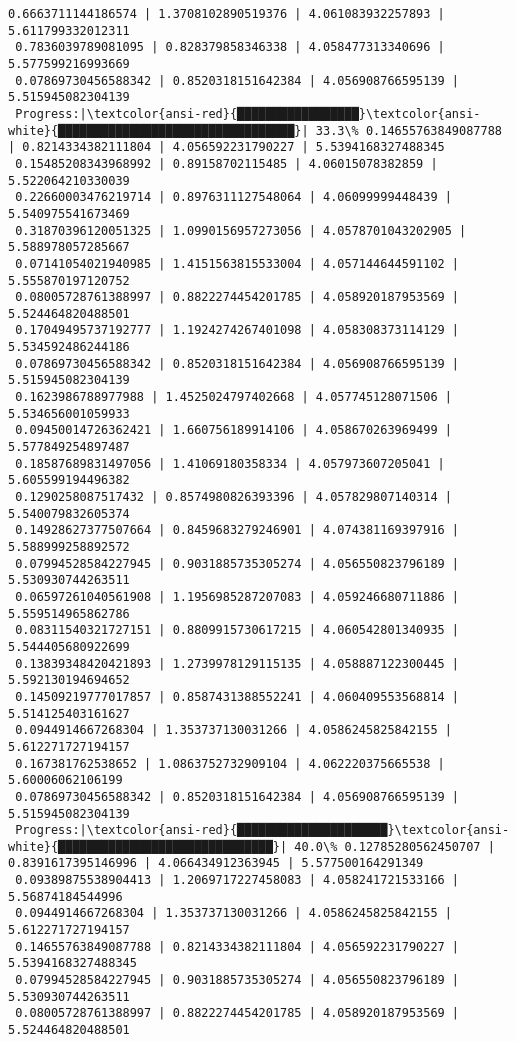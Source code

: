 \documentclass[11pt]{article}
\begin{document}
\begin{Verbatim}[commandchars=\\\{\}]
 0.6663711144186574 | 1.3708102890519376 | 4.061083932257893 | 5.611799332012311
 0.7836039789081095 | 0.828379858346338 | 4.058477313340696 | 5.577599216993669
 0.07869730456588342 | 0.8520318151642384 | 4.056908766595139 | 5.515945082304139
 Progress:|\textcolor{ansi-red}{█████████████████}\textcolor{ansi-white}{█████████████████████████████████}| 33.3\% 0.14655763849087788 | 0.8214334382111804 | 4.056592231790227 | 5.5394168327488345
 0.15485208343968992 | 0.89158702115485 | 4.06015078382859 | 5.522064210330039
 0.22660003476219714 | 0.8976311127548064 | 4.06099999448439 | 5.540975541673469
 0.31870396120051325 | 1.0990156957273056 | 4.0578701043202905 | 5.588978057285667
 0.07141054021940985 | 1.4151563815533004 | 4.057144644591102 | 5.555870197120752
 0.08005728761388997 | 0.8822274454201785 | 4.058920187953569 | 5.524464820488501
 0.17049495737192777 | 1.1924274267401098 | 4.058308373114129 | 5.534592486244186
 0.07869730456588342 | 0.8520318151642384 | 4.056908766595139 | 5.515945082304139
 0.1623986788977988 | 1.4525024797402668 | 4.057745128071506 | 5.534656001059933
 0.09450014726362421 | 1.660756189914106 | 4.058670263969499 | 5.577849254897487
 0.18587689831497056 | 1.41069180358334 | 4.057973607205041 | 5.605599194496382
 0.1290258087517432 | 0.8574980826393396 | 4.057829807140314 | 5.540079832605374
 0.14928627377507664 | 0.8459683279246901 | 4.074381169397916 | 5.588999258892572
 0.07994528584227945 | 0.9031885735305274 | 4.056550823796189 | 5.530930744263511
 0.06597261040561908 | 1.1956985287207083 | 4.059246680711886 | 5.559514965862786
 0.08311540321727151 | 0.8809915730617215 | 4.060542801340935 | 5.544405680922699
 0.13839348420421893 | 1.2739978129115135 | 4.058887122300445 | 5.592130194694652
 0.14509219777017857 | 0.8587431388552241 | 4.060409553568814 | 5.514125403161627
 0.0944914667268304 | 1.353737130031266 | 4.0586245825842155 | 5.612271727194157
 0.167381762538652 | 1.0863752732909104 | 4.062220375665538 | 5.60006062106199
 0.07869730456588342 | 0.8520318151642384 | 4.056908766595139 | 5.515945082304139
 Progress:|\textcolor{ansi-red}{█████████████████████}\textcolor{ansi-white}{██████████████████████████████}| 40.0\% 0.12785280562450707 | 0.8391617395146996 | 4.066434912363945 | 5.577500164291349
 0.09389875538904413 | 1.2069717227458083 | 4.058241721533166 | 5.56874184544996
 0.0944914667268304 | 1.353737130031266 | 4.0586245825842155 | 5.612271727194157
 0.14655763849087788 | 0.8214334382111804 | 4.056592231790227 | 5.5394168327488345
 0.07994528584227945 | 0.9031885735305274 | 4.056550823796189 | 5.530930744263511
 0.08005728761388997 | 0.8822274454201785 | 4.058920187953569 | 5.524464820488501

\end{Verbatim}
\end{document}
